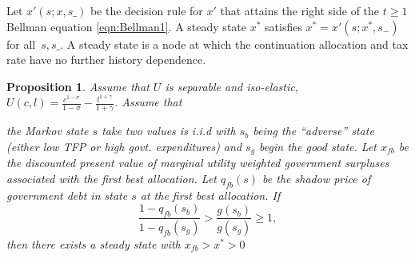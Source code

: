 \documentclass[12pt]{article}
\newcommand{\apb}[1]{\textcolor{magenta}{$^{\textrm{apb}}${#1}}}
\newcommand{\tjs}[1]{\textcolor{red}{$^{\textrm{tjs}}${#1}}}
\newtheorem{proposition}[theorem]{Proposition}
\begin{document}
Let $x'\left( s;{x},s\_\right) $ be the decision rule for $x'$ that attains the right side of the $t\geq1$ Bellman equation
\eqref{eqn:Bellman1}.  A steady state  ${x}^{*} $  satisfies ${ x}^{*}  =x' \left( s;{x}^{*},s_{-}\right) $ for all $%
\,s,s\_$.
A steady state is a node at which the  continuation allocation and tax rate have no further history dependence.

\begin{proposition}\label{prop:existenceU}
Assume that $U$ is  separable and iso-elastic,	 $U(c,l) = \frac{c^{1-\sigma}}{1-\sigma} -\frac{ l^{1+\gamma}}{1+\gamma}$.
Assume that


	 the Markov state $s$ take two values is  i.i.d with $s_b$  being the ``adverse'' state (either low TFP or high govt. expenditures)
and $s_g$ begin the good state.
		Let $x_{fb}$ be the discounted present value of marginal utility weighted government surpluses associated with the first best allocation. 
	 Let $q_{fb}(s)$ be the shadow price of government debt in state $s$ at the first best allocation.
	If
	\begin{equation}\label{eqn:prop52sufficient}
		\frac{1-q_{fb}(s_b)}{1-q_{fb}(s_g)} > \frac{g(s_b)}{g(s_g)}\geq 1 ,
	\end{equation}
		then there exists a steady state with $x_{fb}>x^*>0$
		\end{proposition}
\end{document}
